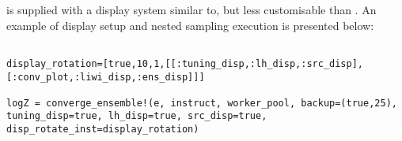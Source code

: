  is supplied with a display system similar to, but less customisable than . An example of display setup and nested sampling execution is presented below:

\begin{verbatim}

display_rotation=[true,10,1,[[:tuning_disp,:lh_disp,:src_disp],[:conv_plot,:liwi_disp,:ens_disp]]]

logZ = converge_ensemble!(e, instruct, worker_pool, backup=(true,25), tuning_disp=true, lh_disp=true, src_disp=true, disp_rotate_inst=display_rotation)
\end{verbatim}

